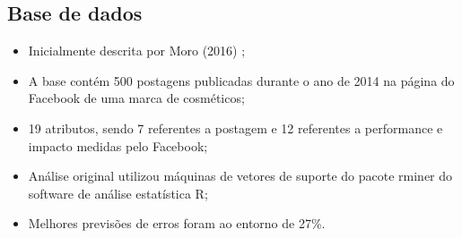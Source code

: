 \subsection{Base de dados}
\begin{frame}
	\begin{itemize}
		\item Inicialmente descrita por Moro (2016) \cite{moro2016};
		\item A base contém 500 postagens publicadas durante o ano de 2014 na página do Facebook de uma marca de cosméticos;
		\item 19 atributos, sendo 7 referentes a postagem e 12 referentes a performance e impacto medidas pelo Facebook;
		\item Análise original utilizou máquinas de vetores de suporte do pacote rminer do software de análise estatística R;
		\item Melhores previsões de erros foram ao entorno de 27\%.
	\end{itemize}
\end{frame}